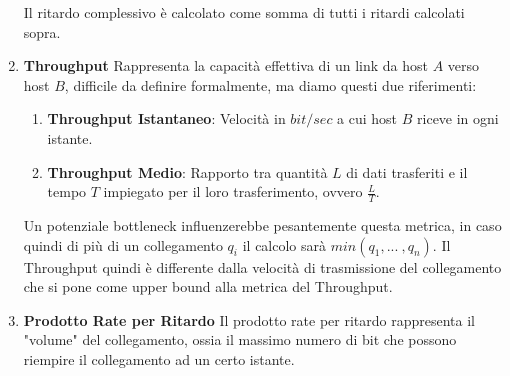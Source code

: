 \documentclass{article}
\begin{document}
\begin{enumerate}
    Il ritardo complessivo è calcolato come somma di tutti i ritardi calcolati sopra.

\newpage

    \item \textbf{Throughput}
    Rappresenta la capacità effettiva di un link da host $A$ verso host $B$, difficile da definire formalmente, ma diamo questi due riferimenti:

    \begin{enumerate}
        \item \textbf{Throughput Istantaneo}: Velocità in $bit/sec$ a cui host $B$ riceve in ogni istante.
        \item \textbf{Throughput Medio}: Rapporto tra quantità $L$ di dati trasferiti e il tempo $T$ impiegato per il loro trasferimento, ovvero $\frac{L}{T}$.
    \end{enumerate}

    Un potenziale bottleneck influenzerebbe pesantemente questa metrica, in caso quindi di più di un collegamento $q_{i}$ il calcolo sarà $min(q_{1}, ...\:, q_{n})$.
    Il Throughput quindi è differente dalla velocità di trasmissione del collegamento che si pone come upper bound alla metrica del Throughput.

    \item \textbf{Prodotto Rate per Ritardo}
    Il prodotto rate per ritardo rappresenta il "volume" del collegamento, ossia il massimo numero di bit che possono riempire il collegamento ad
    un certo istante.

\end{enumerate}

\newpage

\end{document}
